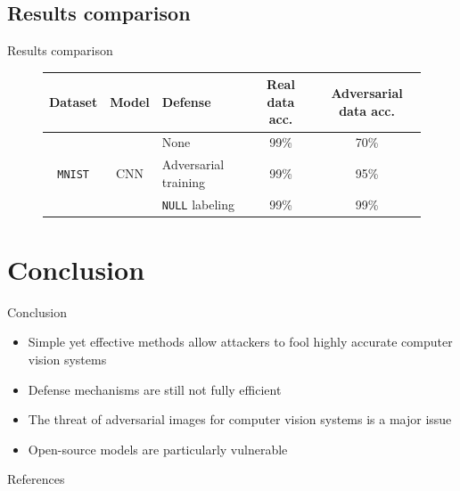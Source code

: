 \documentclass[aspectratio=169]{beamer}
\theoremstyle{definition}
\begin{document}
\subsection{Results comparison}
\begin{frame}{Results comparison}
  \begin{figure}
    \centering
    \renewcommand{\arraystretch}{1.2}
    \begin{tabular}{|c|c|p{3.7cm}||c|c|}
      \hline
      Dataset & Model & \centering Defense & Real data acc. & Adversarial data acc.\\
      \hline\hline
      \multirow{3}{*}{\texttt{MNIST}} & \multirow{3}{*}{CNN} & None & 99\% & 70\%\\\cline{3-5}
      && Adversarial training & 99\% & 95\%\\\cline{3-5}
      && \texttt{NULL} labeling & 99\% & 99\%\\\hline
    \end{tabular}
  \end{figure}
\end{frame}

\section{Conclusion}
\begin{frame}{Conclusion}
  \begin{itemize}
    \item Simple yet effective methods allow attackers to fool highly accurate computer vision systems
    \item Defense mechanisms are still not fully efficient
    \item The threat of adversarial images for computer vision systems is a major issue
    \item Open-source models are particularly vulnerable
  \end{itemize}
\end{frame}


\begin{frame}{References}
    \nocite{*}
    \printbibliography
\end{frame}
\end{document}
